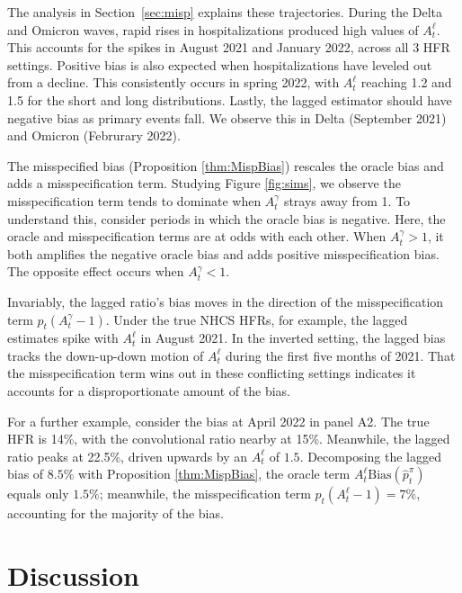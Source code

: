 \documentclass{article}
\renewcommand{\hat}{\widehat} %
\begin{document}
The analysis in Section~\ref{sec:misp} explains these trajectories. During the Delta and Omicron waves, rapid rises in hospitalizations produced high values of $A_t^\ell$. This accounts for the spikes in August 2021 and January 2022, across all 3 HFR settings. Positive bias is also expected when hospitalizations have leveled out from a decline. This consistently occurs in spring 2022, with $A_t^\ell$ reaching 1.2 and 1.5 for the short and long distributions. Lastly, the lagged estimator should have negative bias as primary events fall. We observe this in Delta (September 2021) and Omicron (Februrary 2022). 

The misspecified bias (Proposition \ref{thm:MispBias}) rescales the oracle bias and adds a misspecification term. Studying Figure \ref{fig:sims}, we observe the misspecification term tends to dominate when $A_t^\gamma$ strays away from 1. To understand this, consider periods in which the oracle bias is negative. Here, the oracle and misspecification terms are at odds with each other. 
When $A_t^\gamma > 1$, it both amplifies the negative oracle bias and adds positive misspecification bias. The opposite effect occurs when $A_t^\gamma<1$. 

Invariably, the lagged ratio's bias moves in the direction of the misspecification term $p_t(A_t^\gamma-1)$. Under the true NHCS HFRs, for example, the lagged estimates spike with $A_t^\ell$ in August 2021. In the inverted setting, the lagged bias tracks the down-up-down motion of $A_t^\ell$ during the first five months of 2021. That the misspecification term wins out in these conflicting settings indicates it accounts for a disproportionate amount of the bias. 

For a further example, consider the bias at April 2022 in panel A2. The true HFR is 14\%, with the convolutional ratio nearby at 15\%. Meanwhile, the lagged ratio peaks at 22.5\%, driven upwards by an $A_t^\ell$ of $1.5$. Decomposing the lagged bias of $8.5\%$ with Proposition \ref{thm:MispBias}, the oracle term $A_t^\ell \text{Bias}(\hat{p}_t^\pi)$ equals only $1.5\%$; meanwhile, the misspecification term $p_t(A_t^\ell-1) = 7\%$, accounting for the majority of the bias. 

\section{Discussion}
\end{document}
